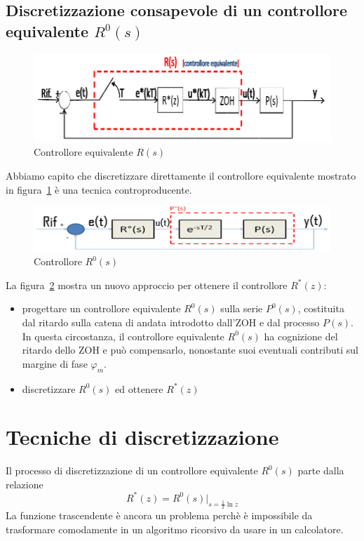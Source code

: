 \documentclass[a4paper]{report}
\begin{document}
\section{Discretizzazione consapevole di un controllore equivalente
  $R^{0}(s)$} 
\begin{figure}[!h]
  \begin{center}
    \includegraphics[scale=0.3]{./figures/controlloreEquivalente.png}
    \caption{Controllore equivalente
      $R(s)$}\label{fig:controlloreEquivalente}
  \end{center}
\end{figure}
Abbiamo capito che discretizzare direttamente il controllore
equivalente mostrato in figura~\ref{fig:controlloreEquivalente} \`e
una tecnica controproducente.
\begin{figure}[!h]
  \begin{center}
    \includegraphics[scale=0.4]{./figures/controlloreR0.png}
    \caption{Controllore $R^0(s)$}\label{fig:controlloreR0}
  \end{center}
\end{figure}
La figura~\ref{fig:controlloreR0} mostra un nuovo approccio per
ottenere il controllore $R^{*}(z)$:
\begin{itemize}
\item progettare un controllore
  equivalente $R^{0}(s)$ sulla serie $P^{0}(s)$, costituita dal ritardo
  sulla catena di andata introdotto dall'ZOH e dal processo $P(s)$. In
  questa circostanza, il controllore equivalente $R^{0}(s)$ ha
  cognizione del ritardo dello ZOH e pu\`o compensarlo, nonostante suoi
  eventuali contributi sul margine di fase $\varphi_m$.
\item discretizzare $R^{0}(s)$ ed ottenere $R^{*}(z)$
\end{itemize}

\chapter{Tecniche di discretizzazione}
Il processo di discretizzazione di un controllore equivalente
$R^{0}(s)$ parte dalla relazione
\begin{equation}
  R^{*}(z) = R^{0}(s)|_{s = \frac{1}{T}\ln z}
\end{equation}
La funzione trascendente \`e ancora un problema perch\`e \`e
impossibile da trasformare comodamente in un algoritmo ricorsivo da
usare in un calcolatore.
\end{document}
